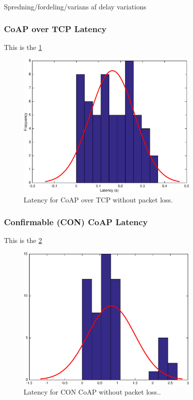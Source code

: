 Spredning/fordeling/varians af delay variations 

\subsubsection{CoAP over TCP Latency}
This is the \figurename \ref{fig_sim}
\begin{figure}[bh]
\centering
\includegraphics[width=3.5in]{gfx/coapovertcp}
\caption{Latency for CoAP over TCP without packet loss.}
\label{fig_sim}
\end{figure}

\subsubsection{Confirmable (CON) CoAP Latency}
This is the \figurename \ref{fig_sim2}
\begin{figure}[bht]
	\centering
	\includegraphics[width=3.5in]{gfx/coapoverudp}
	\caption{Latency for CON CoAP without packet loss..}
	\label{fig_sim2}
\end{figure}



